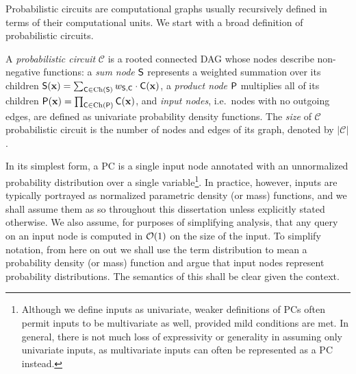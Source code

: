 Probabilistic circuits are computational graphs usually recursively defined in terms of their
computational units. We start with a broad definition of probabilistic circuits.

\begin{definition}
  A \emph{probabilistic circuit} $\mathcal{C}$ is a rooted connected DAG whose nodes describe
  non-negative functions: a \emph{sum node} $\operatorname{\textup{\textsf{S}}}$ represents a weighted summation over its
  children $\operatorname{\textup{\textsf{S}}}(\mathbf{x})=\sum_{\operatorname{\textup{\textsf{C}}}\in\operatorname*{\normalfont{Ch}}(\operatorname{\textup{\textsf{S}}})} w_{\operatorname{\textup{\textsf{S}}},\operatorname{\textup{\textsf{C}}}}\cdot\operatorname{\textup{\textsf{C}}}(\mathbf{x})$, a
  \emph{product node} $\operatorname{\textup{\textsf{P}}}$ multiplies all of its children
  $\operatorname{\textup{\textsf{P}}}(\mathbf{x})=\prod_{\operatorname{\textup{\textsf{C}}}\in\operatorname*{\normalfont{Ch}}(\operatorname{\textup{\textsf{P}}})} \operatorname{\textup{\textsf{C}}}(\mathbf{x})$, and \emph{input nodes}, i.e.\ nodes
  with no outgoing edges, are defined as univariate probability density functions.\label{def:pc}
  The \emph{size} of $\mathcal{C}$ probabilistic circuit is the number of nodes and edges of its
  graph, denoted by $|\mathcal{C}|$.
\end{definition}

In its simplest form, a PC is a single input node annotated with an unnormalized probability
distribution over a single variable\footnote{Although we define inputs as univariate, weaker
definitions of PCs often permit inputs to be multivariate as well, provided mild conditions are
met. In general, there is not much loss of expressivity or generality in assuming only univariate
inputs, as multivariate inputs can often be represented as a PC instead.}. In practice, however,
inputs are typically portrayed as normalized parametric density (or mass) functions, and we shall
assume them as so throughout this dissertation unless explicitly stated otherwise. We also assume,
for purposes of simplifying analysis, that any query on an input node is computed in $\mathcal{O}(1)$ on
the size of the input. To simplify notation, from here on out we shall use the term distribution to
mean a probability density (or mass) function and argue that input nodes represent probability
distributions. The semantics of this shall be clear given the context.

